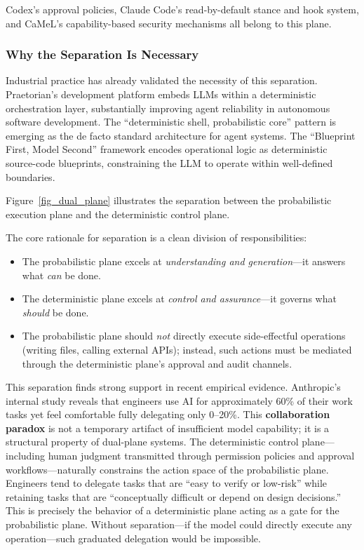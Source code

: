 \documentclass[11pt,a4paper]{article}
\begin{document}
Codex's approval policies\cite{openai_codex_approvals_2026}, Claude Code's read-by-default stance and hook system\cite{anthropic_claudecode_security_2026}, and CaMeL's capability-based security mechanisms\cite{debenedetti2025camel} all belong to this plane.

\subsubsection{Why the Separation Is Necessary}

Industrial practice has already validated the necessity of this separation.
Praetorian's development platform embeds LLMs within a deterministic orchestration layer, substantially improving agent reliability in autonomous software development\cite{praetorian2025deterministic}.
The ``deterministic shell, probabilistic core'' pattern is emerging as the de facto standard architecture for agent systems\cite{towardsai2025deterministicshell}.
The ``Blueprint First, Model Second'' framework encodes operational logic as deterministic source-code blueprints, constraining the LLM to operate within well-defined boundaries\cite{blueprintfirst2025}.

Figure~\ref{fig_dual_plane} illustrates the separation between the probabilistic execution plane and the deterministic control plane.


The core rationale for separation is a clean division of responsibilities:
\begin{itemize}[nosep]
\item The probabilistic plane excels at \textit{understanding and generation}---it answers what \emph{can} be done.
\item The deterministic plane excels at \textit{control and assurance}---it governs what \emph{should} be done.
\item The probabilistic plane should \textit{not} directly execute side-effectful operations (writing files, calling external APIs); instead, such actions must be mediated through the deterministic plane's approval and audit channels.
\end{itemize}

This separation finds strong support in recent empirical evidence.
Anthropic's internal study reveals that engineers use AI for approximately 60\% of their work tasks yet feel comfortable fully delegating only 0--20\%\cite{anthropic2026agenticreport}.
This \textbf{collaboration paradox} is not a temporary artifact of insufficient model capability; it is a structural property of dual-plane systems.
The deterministic control plane---including human judgment transmitted through permission policies and approval workflows---naturally constrains the action space of the probabilistic plane.
Engineers tend to delegate tasks that are ``easy to verify or low-risk'' while retaining tasks that are ``conceptually difficult or depend on design decisions.''
This is precisely the behavior of a deterministic plane acting as a gate for the probabilistic plane.
Without separation---if the model could directly execute any operation---such graduated delegation would be impossible.
\end{document}
